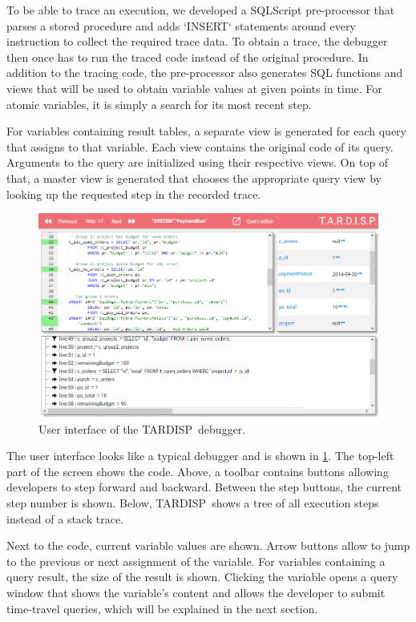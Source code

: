 \documentclass[english,conference,final]{IEEEtran}
\newcommand{\todo}[2][]{\pdfmargincomment[author={#1}]{#2}}
\newcommand{\tool}{TAR\-DISP}
\begin{document}
To be able to trace an execution, we developed a SQLScript pre-processor that parses a stored procedure and adds `INSERT` statements around every instruction to collect the required trace data.
To obtain a trace, the debugger then once has to run the traced code instead of the original procedure.
In addition to the tracing code, the pre-processor also generates SQL functions and views that will be used to obtain variable values at given points in time.
For atomic variables, it is simply a search for its most recent step.

For variables containing result tables, a separate view is generated for each query that assigns to that variable.
Each view contains the original code of its query.
Arguments to the query are initialized using their respective views.
On top of that, a master view is generated that chooses the appropriate query view by looking up the requested step in the recorded trace.

\begin{figure}
	\centering
		\includegraphics[width=\linewidth]{odb.png}
	\caption{User interface of the \tool\ debugger.}
	\label{fig:odb}
\end{figure}

The user interface looks like a typical debugger and is shown in \cref{fig:odb}.
The top-left part of the screen shows the code.
Above, a toolbar contains buttons allowing developers to step forward and backward.
Between the step buttons, the current step number is shown.
Below, \tool\ shows a tree of all execution steps instead of a stack trace.

Next to the code, current variable values are shown.
Arrow buttons allow to jump to the previous or next assignment of the variable.
For variables containing a query result, the size of the result is shown.
Clicking the variable opens a query window that shows the variable's content and allows the developer to submit time-travel queries, which will be explained in the next section.
\end{document}
